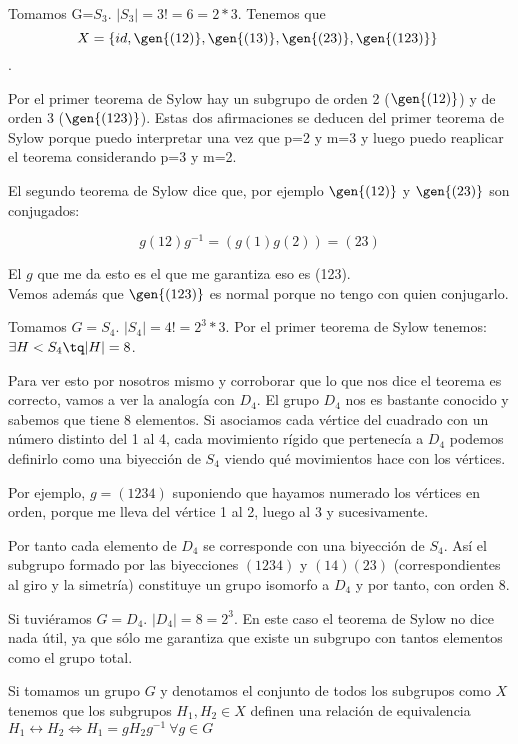 \documentclass[nochap]{apuntes}
\begin{document}
\begin{example} Tomamos G=$S_3$. $|S_3|=3!=6=2*3$. Tenemos que \[ X=\{id, \gen{(12)}, \gen{(13)},\gen{(23)},\gen{(123)}\} \].

 Por el primer teorema de Sylow hay un subgrupo de orden 2 ($\gen{(12)}$) y de orden 3 ($\gen{(123)}$). Estas dos afirmaciones se deducen del primer teorema de Sylow porque puedo interpretar una vez que p=2 y m=3 y luego puedo reaplicar
 el teorema considerando p=3 y m=2.

 El segundo teorema de Sylow dice que, por ejemplo $\gen{(12)}$ y $\gen{(23)}$ son conjugados:

 \[g(12)g^{-1}=(g(1)g(2))=(23)\]

 El $g$ que me da esto es el que me garantiza eso es (123).\\
 Vemos además que $\gen{(123)}$ es normal porque no tengo con quien conjugarlo.
\end{example}

\begin{example}
 Tomamos $G=S_4$. $|S_4|=4!=2^3*3$. Por el primer teorema de Sylow tenemos: $\exists H < S_4 \tq |H|=8$.

 Para ver esto por nosotros mismo y corroborar que lo que nos dice el teorema es correcto, vamos a ver la analogía con $D_4$. El grupo $D_4$ nos es bastante conocido y sabemos que tiene 8 elementos. Si asociamos cada vértice del cuadrado con un número distinto
 del 1 al 4, cada movimiento rígido que pertenecía a $D_4$  podemos definirlo como una biyección de $S_4$  viendo qué movimientos hace
 con los vértices.

 Por ejemplo, $g=(1234)$ suponiendo que hayamos numerado los vértices en orden, porque me lleva del vértice 1 al 2, luego al 3 y sucesivamente.

 Por tanto cada elemento de $D_4$ se corresponde con una biyección de $S_4$. Así el subgrupo formado por las biyecciones $(1234)$ y $(14)(23)$ (correspondientes al giro y la simetría) constituye un grupo isomorfo a $D_4$ y por tanto, con orden 8.
\end{example}

\begin{example}
 Si tuviéramos $G=D_4$. $|D_4|=8=2^3$. En este caso el teorema de Sylow no dice nada útil, ya que sólo me garantiza que existe un subgrupo con tantos elementos como el grupo total.
\end{example}

Si tomamos un grupo $G$ y denotamos el conjunto de todos los subgrupos como $X$ tenemos que los subgrupos $H_1, H_2 \in X$ definen una relación de equivalencia $H_1\rel H_2 \iff H_1 = gH_2g^{-1} \ \forall g\in G$
\end{document}

